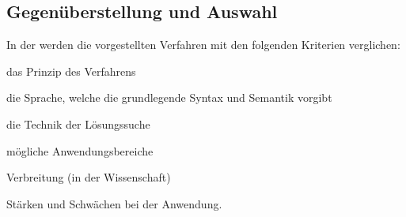 \subsection{Gegenüberstellung und Auswahl}\label{subsec:gegenuberstellung-und-auswahl}

In der  werden die vorgestellten Verfahren mit den folgenden Kriterien verglichen:
\begin{itemize*}[label={}, itemjoin={,}, itemjoin*={{ sowie}}]
    \item das Prinzip des Verfahrens
    \item die Sprache, welche die grundlegende Syntax und Semantik vorgibt
    \item die Technik der Lösungssuche
    \item mögliche Anwendungsbereiche
    \item Verbreitung (in der Wissenschaft)
    \item Stärken und Schwächen bei der Anwendung.
\end{itemize*}

